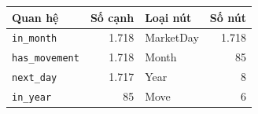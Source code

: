 \begin{tabular}{lrlr}
\toprule
Quan hệ & Số cạnh & Loại nút & Số nút \\
\midrule
\texttt{in\_month} & 1{.}718 & MarketDay & 1{.}718 \\
\texttt{has\_movement} & 1{.}718 & Month & 85 \\
\texttt{next\_day} & 1{.}717 & Year & 8 \\
\texttt{in\_year} & 85 & Move & 6 \\
\bottomrule
\end{tabular}
